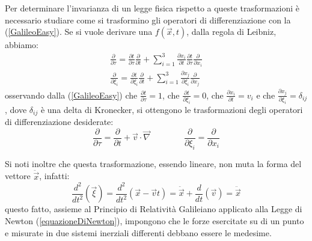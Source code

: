 Per determinare l'invarianza di un legge fisica rispetto a queste trasformazioni è necessario 
studiare come si trasformino gli operatori di differenziazione con la  (\ref{GalileoEasy}). 
Se si vuole derivare una $f(\vec{x},t)$, dalla regola di Leibniz, abbiamo:
\begin{equation*}
	\begin{gathered}
		\frac{\partial}{\partial \tau}=\frac{\partial t}{\partial \tau}\frac{\partial}{\partial t}+
		\sum_{i=1}^{3}\frac{\partial x_i}{\partial t}\frac{\partial t}{\partial \tau}
		\frac{\partial}{\partial x_i} \\
		\frac{\partial}{\partial \xi_i}=\frac{\partial t}{\partial \xi_i}\frac{\partial}{\partial t}+
		\sum_{i=1}^{3}\frac{\partial x_j}{\partial \xi_i}\frac{\partial}{\partial x_j}
	\end{gathered}
\end{equation*}
osservando dalla (\ref{GalileoEasy}) che $\frac{\partial t}{\partial \tau}=1$, che 
$\frac{\partial t}{\partial \xi_i}=0$, che $\frac{\partial x_i}{\partial t}=v_i$ e che 
$\frac{\partial x_j}{\partial \xi_i}=\delta_{ij}$, dove $\delta_{ij}$ è una delta di Kronecker, 
si ottengono le trasformazioni degli operatori di differenziazione desiderate:
\begin{equation}
	\frac{\partial}{\partial \tau}=\frac{\partial}{\partial t}+\vec{v}\cdot\vec{\nabla} \qquad \qquad
	\frac{\partial}{\partial \xi_i}=\frac{\partial}{\partial x_i}
	\label{GalileoDifferenziale}
\end{equation}

Si noti inoltre che questa trasformazione, essendo lineare, non muta la forma del vettore $\ddot{\vec{x}}$, infatti:
\begin{equation*}
	\frac{d^2}{dt^2}(\vec{\xi})=\frac{d^2}{dt^2}(\vec{x}-\vec{v}t)=\ddot{\vec{x}}+\frac{d}{dt}(\vec{v})=\ddot{\vec{x}}
\end{equation*} 
questo fatto, assieme al Principio di Relatività Galileiano applicato alla Legge di Newton (\ref{equazioneDiNewton}), 
impongono che le forze esercitate su di un punto e misurate in due sistemi inerziali differenti debbano essere le medesime. 
